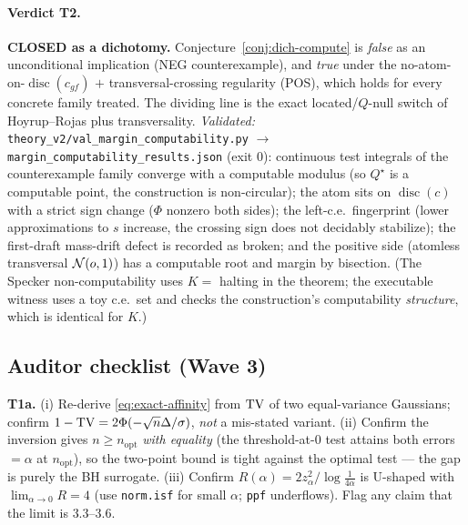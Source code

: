 \paragraph{Verdict T2.} \textbf{CLOSED as a dichotomy.} Conjecture~\ref{conj:dich-compute} is
\emph{false} as an unconditional implication (NEG counterexample), and \emph{true} under the
no-atom-on-$\operatorname{disc}(c_{gf})$ $+$ transversal-crossing regularity (POS), which holds
for every concrete family treated. The dividing line is the exact located/$Q$-null switch of
Hoyrup--Rojas plus transversality. \emph{Validated:}
\texttt{theory\_v2/val\_margin\_computability.py} $\to$
\texttt{margin\_computability\_results.json} (exit $0$): continuous test integrals of the
counterexample family converge with a computable modulus (so $Q^\star$ is a computable point,
the construction is non-circular); the atom sits on $\operatorname{disc}(c)$ with a strict sign
change ($\Phi$ nonzero both sides); the left-c.e.\ fingerprint (lower approximations to $s$
increase, the crossing sign does not decidably stabilize); the first-draft mass-drift defect is
recorded as broken; and the positive side (atomless transversal $\mathcal N(o,1)$) has a computable
root and margin by bisection. (The Specker non-computability uses $K=$ halting in the theorem;
the executable witness uses a toy c.e.\ set and checks the construction's computability
\emph{structure}, which is identical for $K$.)

\subsection*{Auditor checklist (Wave 3)}
\noindent\textbf{T1a.} (i) Re-derive \eqref{eq:exact-affinity} from $\mathrm{TV}$ of two equal-variance
Gaussians; confirm $1-\mathrm{TV}=2\Phi(-\sqrt n\Delta/\sigma)$, \emph{not} a mis-stated variant.
(ii) Confirm the inversion gives $n\ge n_{\mathrm{opt}}$ \emph{with equality} (the threshold-at-$0$
test attains both errors $=\alpha$ at $n_{\mathrm{opt}}$), so the two-point bound is tight
against the optimal test --- the gap is purely the BH surrogate. (iii) Confirm
$R(\alpha)=2z_\alpha^2/\log\tfrac1{4\alpha}$ is U-shaped with $\lim_{\alpha\to0}R=4$ (use
\texttt{norm.isf} for small $\alpha$; \texttt{ppf} underflows). Flag any claim that the limit is
$3.3$--$3.6$.

